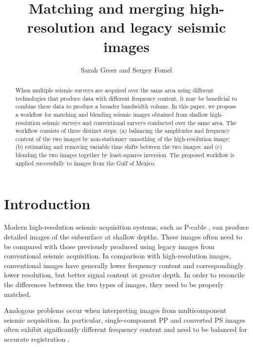 \title{Matching and merging high-resolution and legacy seismic images}
\author{Sarah Greer and Sergey Fomel}

\maketitle

\begin{abstract}
When multiple seismic surveys are acquired over the same area using different technologies that produce data with different frequency content, it may be beneficial to combine these data to produce a broader bandwidth volume.
In this paper, we propose a workflow for matching and blending seismic images obtained from shallow high-resolution seismic surveys and conventional surveys conducted over the same area.
The workflow consists of three distinct steps:
(a) balancing the amplitudes and frequency content of the two images by non-stationary smoothing of the high-resolution image;
(b) estimating and removing variable time shifts between the two images; and
(c) blending the two images together by least-squares inversion.
The proposed workflow is applied successfully to images from the Gulf of Mexico.

\end{abstract}

\section{Introduction}

Modern high-resolution seismic acquisition systems, such as P-cable \cite[]{pcable,tip}, can produce detailed images of the subsurface at shallow depths.
These images often need to be compared with those previously produced using legacy images from conventional seismic acquisition.
In comparison with high-resolution images, conventional images have generally lower frequency content and correspondingly lower resolution, but better signal content at greater depth.
In order to reconcile the differences between the two types of images, they need to be properly matched.

Analogous problems occur when interpreting images from multicomponent seismic acquisition.
In particular, single-component PP and converted PS images often exhibit significantly different frequency content and need to be balanced for accurate registration \cite[]{hardage,SEG-2003-07810784,warp}.

